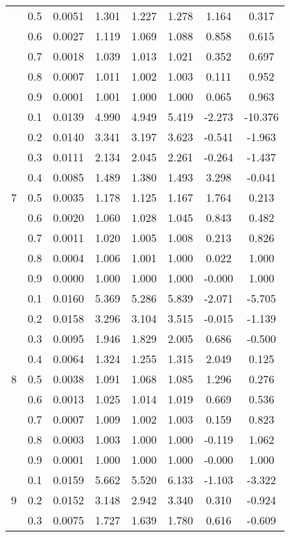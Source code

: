 \documentclass[11pt,a4paper]{report}
\begin{document}
\begin{longtable}{ | c | c || c | c | c | c | c | c | }
 & 0.5 & 0.0051 & 1.301 & 1.227 & 1.278 & 1.164 & 0.317 \\
 & 0.6 & 0.0027 & 1.119 & 1.069 & 1.088 & 0.858 & 0.615 \\
 & 0.7 & 0.0018 & 1.039 & 1.013 & 1.021 & 0.352 & 0.697 \\
 & 0.8 & 0.0007 & 1.011 & 1.002 & 1.003 & 0.111 & 0.952 \\
 & 0.9 & 0.0001 & 1.001 & 1.000 & 1.000 & 0.065 & 0.963 \\
 \hline
\multirow{9}{*}{7} & 0.1 & 0.0139 & 4.990 & 4.949 & 5.419 & -2.273 & -10.376 \\
 & 0.2 & 0.0140 & 3.341 & 3.197 & 3.623 & -0.541 & -1.963 \\
 & 0.3 & 0.0111 & 2.134 & 2.045 & 2.261 & -0.264 & -1.437 \\
 & 0.4 & 0.0085 & 1.489 & 1.380 & 1.493 & 3.298 & -0.041 \\
 & 0.5 & 0.0035 & 1.178 & 1.125 & 1.167 & 1.764 & 0.213 \\
 & 0.6 & 0.0020 & 1.060 & 1.028 & 1.045 & 0.843 & 0.482 \\
 & 0.7 & 0.0011 & 1.020 & 1.005 & 1.008 & 0.213 & 0.826 \\
 & 0.8 & 0.0004 & 1.006 & 1.001 & 1.000 & 0.022 & 1.000 \\
 & 0.9 & 0.0000 & 1.000 & 1.000 & 1.000 & -0.000 & 1.000 \\
 \hline
\multirow{9}{*}{8} & 0.1 & 0.0160 & 5.369 & 5.286 & 5.839 & -2.071 & -5.705 \\
 & 0.2 & 0.0158 & 3.296 & 3.104 & 3.515 & -0.015 & -1.139 \\
 & 0.3 & 0.0095 & 1.946 & 1.829 & 2.005 & 0.686 & -0.500 \\
 & 0.4 & 0.0064 & 1.324 & 1.255 & 1.315 & 2.049 & 0.125 \\
 & 0.5 & 0.0038 & 1.091 & 1.068 & 1.085 & 1.296 & 0.276 \\
 & 0.6 & 0.0013 & 1.025 & 1.014 & 1.019 & 0.669 & 0.536 \\
 & 0.7 & 0.0007 & 1.009 & 1.002 & 1.003 & 0.159 & 0.823 \\
 & 0.8 & 0.0003 & 1.003 & 1.000 & 1.000 & -0.119 & 1.062 \\
 & 0.9 & 0.0001 & 1.000 & 1.000 & 1.000 & -0.000 & 1.000 \\
 \hline
\multirow{9}{*}{9} & 0.1 & 0.0159 & 5.662 & 5.520 & 6.133 & -1.103 & -3.322 \\
 & 0.2 & 0.0152 & 3.148 & 2.942 & 3.340 & 0.310 & -0.924 \\
 & 0.3 & 0.0075 & 1.727 & 1.639 & 1.780 & 0.616 & -0.609 \\

\end{longtable}
\end{document}
